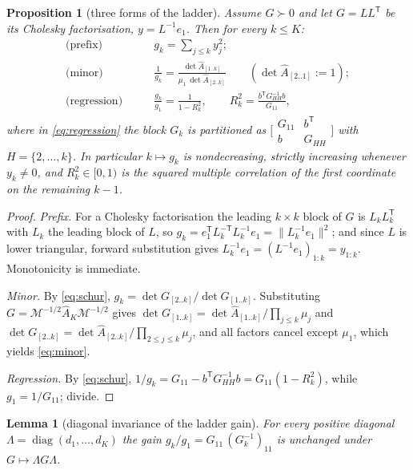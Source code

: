 \documentclass[11pt,a4paper]{article}
\theoremstyle{plain}
\newtheorem{proposition}[theorem]{Proposition}
\newtheorem{lemma}[theorem]{Lemma}
\theoremstyle{definition}
\newcommand{\T}{\mathsf{T}}
\newcommand{\PD}{\succ 0}
\newcommand{\Ah}{\widehat{A}}
\newcommand{\MM}{\mathcal{M}}
\DeclareMathOperator{\diag}{diag}
\begin{document}
\begin{proposition}[three forms of the ladder]
\label{prop:cascade}
Assume $G\PD$ and let $G=LL^{\T}$ be its Cholesky factorisation,
$y=L^{-1}e_1$. Then for every $k\le K$:
\begin{align}
\label{eq:prefix}
  \text{(prefix)}\qquad & g_k=\sum_{j\le k}y_j^{2};\\
\label{eq:minor}
  \text{(minor)}\qquad & \frac1{g_k}
    =\frac{\det\Ah_{[1..k]}}{\mu_1\,\det\Ah_{[2..k]}}
    \qquad(\det\Ah_{[2..1]}:=1);\\
\label{eq:regression}
  \text{(regression)}\qquad & \frac{g_k}{g_1}=\frac1{1-R_k^{2}},
    \qquad R_k^{2}=\frac{b^{\T}G_{HH}^{-1}b}{G_{11}},
\end{align}
where in \eqref{eq:regression} the block $G_k$ is partitioned as
$\bigl[\begin{smallmatrix}G_{11}&b^{\T}\\ b&G_{HH}\end{smallmatrix}\bigr]$ with
$H=\{2,\dots,k\}$. In particular $k\mapsto g_k$ is nondecreasing, strictly
increasing whenever $y_k\ne0$, and $R_k^{2}\in[0,1)$ is the squared multiple
correlation of the first coordinate on the remaining $k-1$.
\end{proposition}

\begin{proof}
\emph{Prefix.} For a Cholesky factorisation the leading $k\times k$ block of $G$
is $L_kL_k^{\T}$ with $L_k$ the leading block of $L$, so
$g_k=e_1^{\T}L_k^{-\T}L_k^{-1}e_1=\lVert L_k^{-1}e_1\rVert^{2}$; and since $L$
is lower triangular, forward substitution gives
$L_k^{-1}e_1=(L^{-1}e_1)_{1:k}=y_{1:k}$. Monotonicity is immediate.

\emph{Minor.} By \eqref{eq:schur},
$g_k=\det G_{[2..k]}/\det G_{[1..k]}$. Substituting
$G=\MM^{-1/2}\Ah_K\MM^{-1/2}$ gives
$\det G_{[1..k]}=\det\Ah_{[1..k]}/\prod_{j\le k}\mu_j$ and
$\det G_{[2..k]}=\det\Ah_{[2..k]}/\prod_{2\le j\le k}\mu_j$, and all factors
cancel except $\mu_1$, which yields \eqref{eq:minor}.

\emph{Regression.} By \eqref{eq:schur}, $1/g_k=G_{11}-b^{\T}G_{HH}^{-1}b
=G_{11}(1-R_k^{2})$, while $g_1=1/G_{11}$; divide.
\end{proof}

\begin{lemma}[diagonal invariance of the ladder gain]
\label{lem:diaginv}
For every positive diagonal $\Lambda=\diag(d_1,\dots,d_K)$ the gain
$g_k/g_1=G_{11}\,(G_k^{-1})_{11}$ is unchanged under $G\mapsto\Lambda G\Lambda$.
\end{lemma}
\end{document}
